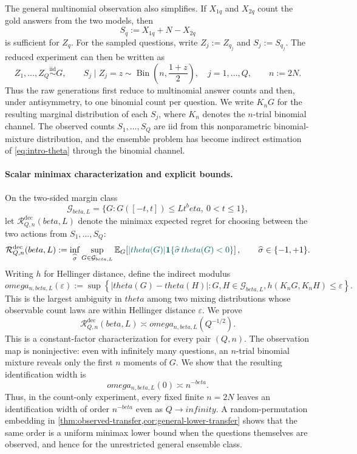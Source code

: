 \documentclass[11pt]{article}
\def\beta{beta}%
\def\theta{theta}%
\def\omega{omega}%
\def\infty{infinity}%
\newcommand{\E}{\mathbb E}
\newcommand{\one}{\mathbf 1}
\newcommand{\Bin}{\operatorname{Bin}}
\newcommand{\calG}{\mathcal G}
\newcommand{\calR}{\mathcal R}
\newcommand{\eps}{\varepsilon}
\newcommand\ced[1]{{\color{teal!70!black} #1}}
\newcommand\ded[1]{{\color{orange!80!black} #1}}
\begin{document}
The general multinomial observation also simplifies.  If $X_{1q}$ and $X_{2q}$ count the gold answers from the two models, then
\[
S_q:=X_{1q}+N-X_{2q}
\]
is sufficient for $Z_q$.  For the sampled questions, write $Z_j:=Z_{q_j}$ and $S_j:=S_{q_j}$.  The reduced experiment can then be written as
\begin{equation}
\label{eq:intro-binomial-channel}
Z_1,\ldots,Z_Q\overset{\mathrm{iid}}{\sim}G,
\qquad
S_j\mid Z_j=z
\sim
\Bin\left(n,\frac{1+z}{2}\right),
\quad j=1,\ldots,Q,
\qquad n:=2N.
\end{equation}
Thus the raw generations first reduce to multinomial answer counts and then, under antisymmetry, to one binomial count per question.  We write $K_nG$ for the resulting marginal distribution of each $S_j$, where $K_n$ denotes the $n$-trial binomial channel.  The observed counts $S_1,\ldots,S_Q$ are iid from this nonparametric binomial-mixture distribution, and the ensemble problem has become indirect estimation of \eqref{eq:intro-theta} through the binomial channel.

\paragraph{Scalar minimax characterization and explicit bounds.}
On the two-sided margin class
\[
\calG_{\beta,L}
=
\{G:G([-t,t])\le Lt^\beta,\ 0<t\le1\},
\]
let $\calR^{\mathrm{dec}}_{Q,n}(\beta,L)$ denote the minimax expected regret for choosing between the two actions from $S_1,\ldots,S_Q$:
\[
\calR^{\mathrm{dec}}_{Q,n}(\beta,L)
:=
\inf_{\widehat\sigma}
\sup_{G\in\calG_{\beta,L}}
\E_G\!\left[
\ced{|\theta(G)|
\one\{\widehat\sigma\,\theta(G)<0\}}
\right],
\qquad \widehat\sigma\in\{-1,+1\}.
\]
Writing $h$ for Hellinger distance, define the indirect modulus
\[
\omega_{n,\beta,L}(\eps)
:=
\sup\left\{
|\theta(G)-\theta(H)|:
G,H\in\calG_{\beta,L},
h(K_nG,K_nH)\le\eps
\right\}.
\]
This is the largest ambiguity in $\theta$ among two mixing distributions whose observable count laws are within Hellinger distance $\eps$.  We prove %
\begin{equation}
\label{eq:intro-modulus}
\calR^{\mathrm{dec}}_{Q,n}(\beta,L)
\asymp
\omega_{n,\beta,L}(Q^{-1/2}).
\end{equation}
This is a constant-factor characterization for every pair $(Q,n)$.  The observation map is noninjective: even with infinitely many questions, an $n$-trial binomial mixture reveals only the first $n$ moments of $G$.  We show that the resulting identification width is
\begin{equation}
\label{eq:intro-floor}
\omega_{n,\beta,L}(0)
\asymp
n^{-\beta}.
\end{equation}
\ded{Thus, in the count-only experiment, every fixed finite $n=2N$ leaves an identification width of order $n^{-\beta}$ even as $Q\to\infty$.  A random-permutation embedding in \cref{thm:observed-transfer,cor:general-lower-transfer} shows that the same order is a uniform minimax lower bound when the questions themselves are observed, and hence for the unrestricted general ensemble class.}
\end{document}
